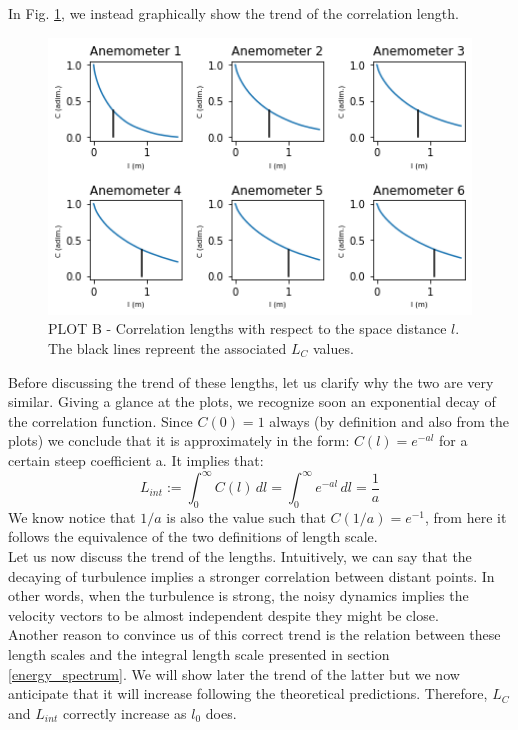 \documentclass[11pt,titlepage]{article}
\begin{document}
In Fig. \ref{fig2}, we instead graphically show the trend of the correlation length.
	\begin{center} 
	\begin{figure} [h]
		\centering
		\includegraphics[width = 4.5in]{./figures/ex1_2.png}
		\caption{PLOT B - Correlation lengths with respect to the space distance $l$. The black lines repreent the associated $L_C$ values.}
		\label{fig2}
	\end{figure}
\end{center}

Before discussing the trend of these lengths, let us clarify why the two are very similar. Giving a glance at the plots, we recognize soon an exponential decay of the correlation function. Since $C(0)=1$ always (by definition and also from the plots) we conclude that it is approximately in the form: $C(l) = e^{-al}$ for a certain steep coefficient a. It implies that:
\begin{equation*}
	L_{int} := \int_0^{\infty} C(l)\, dl =  \int_0^{\infty} e^{-al}\, dl = \frac{1}{a}
\end{equation*}
We know notice that $1/a$ is also the value such that $C(1/a) = e^{-1}$, from here it follows the equivalence of the two definitions of length scale. \\

Let us now discuss the trend of the lengths. Intuitively, we can say that the decaying of turbulence implies a stronger correlation between distant points. In other words, when the turbulence is strong, the noisy dynamics implies the velocity vectors to be almost independent despite they might be close. \\ 
Another reason to convince us of this correct trend is the relation between these length scales and the integral length scale presented in section \ref{energy_spectrum}. We will show later the trend of the latter but we now anticipate that it will increase following the theoretical predictions. Therefore, $L_C$ and $L_{int}$ correctly increase as $l_0$ does.
\end{document}

